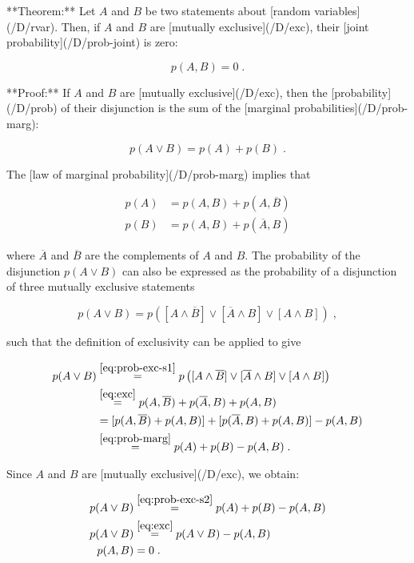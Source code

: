 \documentclass[a4paper,12pt]{article}
\begin{document}
**Theorem:** Let $A$ and $B$ be two statements about [random variables](/D/rvar). Then, if $A$ and $B$ are [mutually exclusive](/D/exc), their [joint probability](/D/prob-joint) is zero:

$$ \label{eq:prob-exc}
p(A,B) = 0 \; .
$$


**Proof:** If $A$ and $B$ are [mutually exclusive](/D/exc), then the [probability](/D/prob) of their disjunction is the sum of the [marginal probabilities](/D/prob-marg):

$$ \label{eq:exc}
p(A \vee B) = p(A) + p(B) \; .
$$

The [law of marginal probability](/D/prob-marg) implies that

\begin{equation} \label{eq:prob-marg}
\begin{split}
p(A) &= p(A,B) + p(A,\overline{B}) \\
p(B) &= p(A,B) + p(\overline{A},B)
\end{split}
\end{equation}

where $\overline{A}$ and $\overline{B}$ are the complements of $A$ and $B$. The probability of the disjunction $p(A \vee B)$ can also be expressed as the probability of a disjunction of three mutually exclusive statements

$$ \label{eq:prob-exc-s1}
p(A \vee B) = p\left([A \wedge \overline{B}] \vee [\overline{A} \wedge B] \vee [A \wedge B] \right) \; ,
$$

such that the definition of exclusivity can be applied to give

\begin{equation} \label{eq:prob-exc-s2}
\begin{split}
p(A \vee B) &\overset{\eqref{eq:prob-exc-s1}}{=} p\left([A \wedge \overline{B}] \vee [\overline{A} \wedge B] \vee [A \wedge B] \right) \\
&\overset{\eqref{eq:exc}}{=} p(A,\overline{B}) + p(\overline{A},B) + p(A,B) \\
&= [p(A,\overline{B}) + p(A,B)] + [p(\overline{A},B) + p(A,B)] - p(A,B) \\
&\overset{\eqref{eq:prob-marg}}{=} p(A) + p(B) - p(A,B) \; .
\end{split}
\end{equation}

Since $A$ and $B$ are [mutually exclusive](/D/exc), we obtain:

\begin{equation} \label{eq:prob-exc-qed}
\begin{split}
p(A \vee B) &\overset{\eqref{eq:prob-exc-s2}}{=} p(A) + p(B) - p(A,B) \\
p(A \vee B) &\overset{\eqref{eq:exc}}{=} p(A \vee B) - p(A,B) \\
p(A,B) &= 0 \; .
\end{split}
\end{equation}
\end{document}
